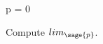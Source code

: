 \documentclass{ximera}
\author{Jim Fowler}
\begin{document}
\begin{sagesilent}
  p = 0
\end{sagesilent}

\begin{exercise}

  Compute $\mathop{lim}_{\sage{p}}$.


  
\end{exercise}
\end{document}
